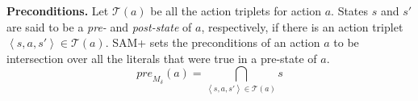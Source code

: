 \documentclass[letterpaper]{article} %
\newcommand{\pre}{\textit{pre}}
\newcommand{\tuple}[1]{\ensuremath{\left \langle #1 \right \rangle }}
\begin{document}
\noindent \textbf{Preconditions.} 
Let $\mathcal{T}(a)$ be all the action triplets for action $a$. 
States $s$ and $s'$ are said to be a \emph{pre-} and \emph{post-state} of $a$, respectively, if there is an action triplet $\tuple{s,a,s'}\in \mathcal{T}(a)$. 
SAM+ sets the preconditions of an action $a$ to be intersection over all the literals that were true in a pre-state of $a$. 
\begin{equation}
        \pre_{M_\delta}(a) =  \bigcap_{\tuple{s, a, s'}\in \mathcal{T}(a)} s \label{eq:pre} 
\end{equation}        





\end{document}
